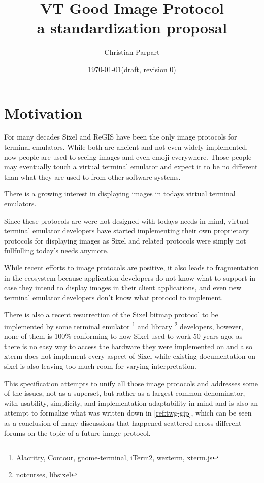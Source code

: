 \documentclass[a4paper]{article}
\title{VT Good Image Protocol \\
a standardization proposal}
\author{Christian Parpart}
\date{\today \quad (draft, revision 0)}
\begin{document}
\maketitle

\tableofcontents


\section{Motivation} %

For many decades Sixel and ReGIS have been the only image protocols for terminal emulators.
While both are ancient and not even widely implemented, now people are used
to seeing images and even emoji everywhere.
Those people may eventually touch a virtual terminal emulator and expect it to be no different
than what they are used to from other software systems.

There is a growing interest in displaying images in todays
virtual terminal emulators.

Since these protocols are were not designed with todays needs in mind,
virtual terminal emulator developers have started implementing their own
proprietary protocols for displaying images as Sixel and related
protocols were simply not fullfulling today's needs anymore.

While recent efforts to image protocols are positive, it also leads to fragmentation in the ecosystem
because application developers do not know what to support in case they intend
to display images in their client applications, and even new terminal emulator
developers don't know what protocol to implement.

There is also a recent resurrection of the Sixel bitmap protocol
to be implemented by some terminal emulator
\footnote{Alacritty, Contour, gnome-terminal, iTerm2, wezterm, xterm.js}
and library \footnote{notcurses, libsixel} developers,
however, none of them is 100\% conforming to how Sixel used to work 50 years ago,
as there is no easy way to access the hardware they were implemented on
and also xterm does not implement every aspect of Sixel while existing
documentation on sixel is also leaving too much room for varying interpretation.

This specification attempts to unify all those image protocols and addresses
some of the issues, not as a superset, but rather as a largest common denominator,
with usability, simplicity, and implementation adaptability in mind and
is also an attempt to formalize what was written down in \ref{ref:twg-gip},
which can be seen as a conclusion of many discussions that happened scattered
across different forums on the topic of a future image protocol.
\end{document}
